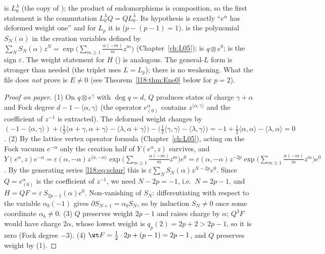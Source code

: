 \begin{dictionary}
 is $L^\lambda_0$ (the  copy of ); the product \lean{*} of
endomorphisms is composition, so the first statement is the commutation $L^\lambda_0Q=QL^\lambda_0$.
Its hypothesis  is exactly ``$e^\alpha$ has deformed weight one'' and for $L_p$ it is
 ($p-(p-1)=1$).  is the polynomial $S_N(\alpha)$ in the
creation variables defined by $\sum_NS_N(\alpha)z^N=\exp\bigl(\sum_{m\ge1}\frac{\alpha(-m)}{m}z^m\bigr)$
(Chapter~\ref{ch:L05});  is $q\otimes e^0$;  is the sign
$\varepsilon$. The weight statement for $H$ () is analogous. The general-$L$
form is stronger than needed (the triplet uses $L=L_p$); there is no weakening. What the file does
\emph{not} prove is $E\ne0$ (see Theorem~\ref{l18:thm:Ene0} below for $p=2$).
\end{dictionary}
\begin{proof}[Proof on paper]
(1) On $q\otimes e^\gamma$ with $\deg q=d$, $Q$ produces states of charge $\gamma+\alpha$ and Fock degree
$d-1-\langle\alpha,\gamma\rangle$ (the operator $e^\alpha_{(0)}$ contains $z^{\langle\alpha,\gamma\rangle}$ and the coefficient
of $z^{-1}$ is extracted). The deformed weight changes by
$(-1-\langle\alpha,\gamma\rangle)+\bigl(\tfrac12\langle\alpha+\gamma,\alpha+\gamma\rangle-\langle\lambda,\alpha+\gamma\rangle\bigr)-\bigl(\tfrac12\langle\gamma,\gamma\rangle-\langle\lambda,\gamma\rangle\bigr)
=-1+\tfrac12\langle\alpha,\alpha\rangle-\langle\lambda,\alpha\rangle=0$.
(2) By the lattice vertex operator formula (Chapter~\ref{ch:L05}), acting on the Fock vacuum
$e^{-\alpha}$ only the creation half of $Y(e^\alpha,z)$ survives, and
$Y(e^\alpha,z)e^{-\alpha}=\varepsilon(\alpha,-\alpha)z^{\langle\alpha,-\alpha\rangle}\exp\bigl(\sum_{m\ge1}\frac{\alpha(-m)}mz^m\bigr)e^0
=\varepsilon(\alpha,-\alpha)z^{-2p}\exp\bigl(\sum_{m\ge1}\frac{\alpha(-m)}mz^m\bigr)e^0$. By the generating
series \eqref{l18:eq:schur} this is $\varepsilon\sum_NS_N(\alpha)z^{N-2p}e^0$. Since
$Q=e^\alpha_{(0)}$ is the coefficient of $z^{-1}$, we need $N-2p=-1$, i.e.\ $N=2p-1$, and
$H=QF=\varepsilon\,S_{2p-1}(\alpha)e^0$. Non-vanishing of $S_N$: differentiating
with respect to the variable $\alpha_b(-1)$ gives $\partial S_{N+1}=\alpha_bS_N$, so by induction
$S_N\ne0$ once some coordinate $\alpha_b\ne0$. (3) $Q$ preserves weight $2p-1$ and raises charge by $\alpha$;
$Q^3F$ would have charge $2\alpha$, whose lowest weight is $q_p(2)=2p+2>2p-1$, so it is zero (Fock
degree $-3$). (4) $\wt F=\frac12\cdot2p+(p-1)=2p-1$, and $Q$ preserves weight by (1).
\end{proof}
